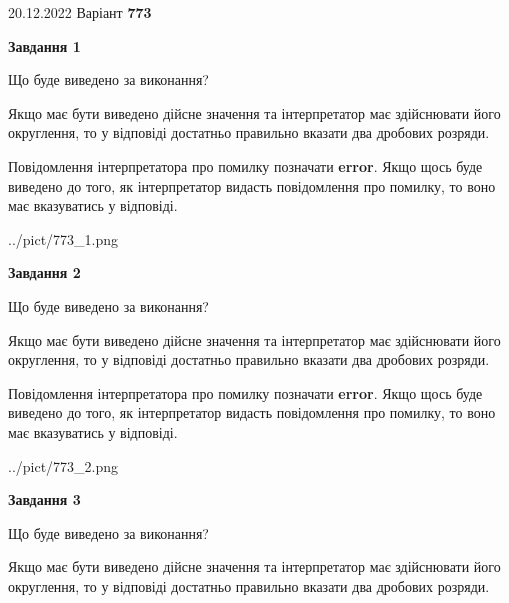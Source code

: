 \documentclass[12pt, ukrainian]{article}
\begin{document}
{20.12.2022 Варіант \No \textbf { 773 }\par}
{
\begin {Large}

{\begin {center}\textbf{Завдання 1}\end {center}}\par
Що буде виведено за виконання? \par

Якщо має бути виведено дійсне значення та інтерпретатор має здійснювати його округлення, 
то у відповіді достатньо правильно вказати два дробових розряди.

Повідомлення інтерпретатора про помилку позначати \textbf{error}.
Якщо щось буде виведено до того, як інтерпретатор видасть повідомлення про помилку, 
то воно має вказуватись у відповіді. \par

\begin{center}
	{../pict/773_1.png}
\end{center}
\newpage

{\begin {center}\textbf{Завдання 2}\end {center}}\par
Що буде виведено за виконання? \par

Якщо має бути виведено дійсне значення та інтерпретатор має здійснювати його округлення, 
то у відповіді достатньо правильно вказати два дробових розряди.

Повідомлення інтерпретатора про помилку позначати \textbf{error}.
Якщо щось буде виведено до того, як інтерпретатор видасть повідомлення про помилку, 
то воно має вказуватись у відповіді. \par

\begin{center}
	{../pict/773_2.png}
\end{center}
\newpage

{\begin {center}\textbf{Завдання 3}\end {center}}\par
Що буде виведено за виконання? \par

Якщо має бути виведено дійсне значення та інтерпретатор має здійснювати його округлення, 
то у відповіді достатньо правильно вказати два дробових розряди.


\end{Large}}
\end{document}

